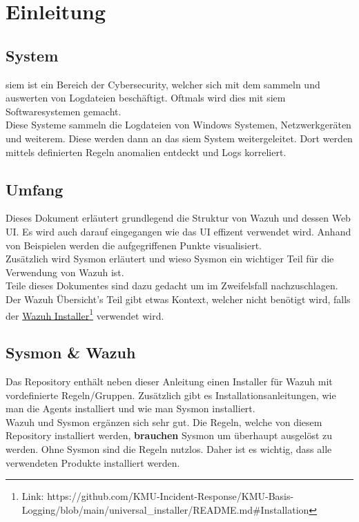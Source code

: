 \chapter{Einleitung}

\section{ System}
\acrfull{siem} ist ein Bereich der Cybersecurity, welcher sich mit dem sammeln und auswerten von Logdateien beschäftigt.
Oftmals wird dies mit \acrshort{siem} Softwaresystemen gemacht.\\

Diese Systeme sammeln die Logdateien von Windows Systemen, Netzwerkgeräten und weiterem.
Diese werden dann an das \acrshort{siem} System weitergeleitet.
Dort werden mittels definierten Regeln anomalien entdeckt und Logs korreliert.

\section{Umfang}
Dieses Dokument erläutert grundlegend die Struktur von Wazuh und dessen Web UI.
Es wird auch darauf eingegangen wie das UI effizent verwendet wird.
Anhand von Beispielen werden die aufgegriffenen Punkte visualisiert.\\

Zusätzlich wird Sysmon erläutert und wieso Sysmon ein wichtiger Teil für die Verwendung von Wazuh ist.\\

Teile dieses Dokumentes sind dazu gedacht um im Zweifelsfall nachzuschlagen.
Der Wazuh Übersicht's Teil gibt etwas Kontext, welcher nicht benötigt wird, falls der \href{https://github.com/KMU-Incident-Response/KMU-Basis-Logging/blob/main/universal\_installer/README.md\#Installation}{Wazuh Installer}\footnote{Link: https://github.com/KMU-Incident-Response/KMU-Basis-Logging/blob/main/universal\_installer/README.md\#Installation} verwendet wird.

\section{Sysmon \& Wazuh}
Das Repository enthält neben dieser Anleitung einen Installer für Wazuh mit vordefinierte Regeln/Gruppen.
Zusätzlich gibt es Installationsanleitungen, wie man die Agents installiert und wie man Sysmon installiert.\\

Wazuh und Sysmon ergänzen sich sehr gut.
Die Regeln, welche von diesem Repository installiert werden, \textbf{brauchen} Sysmon um überhaupt ausgelöst zu werden.
Ohne Sysmon sind die Regeln nutzlos. 
Daher ist es wichtig, dass alle verwendeten Produkte installiert werden.